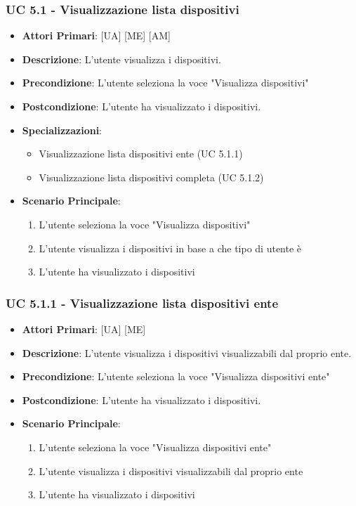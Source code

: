 			\subsubsection{UC 5.1 - Visualizzazione lista dispositivi}
			\begin{itemize}
				\item \textbf{Attori Primari}: [UA] [ME] [AM]
				\item \textbf{Descrizione}: L'utente visualizza i dispositivi.
				\item \textbf{Precondizione}: L'utente seleziona la voce "Visualizza dispositivi"
				\item \textbf{Postcondizione}: L'utente ha visualizzato i dispositivi.
				\item \textbf{Specializzazioni}:
				\begin{itemize}
					\item Visualizzazione lista dispositivi ente (UC 5.1.1)
					\item Visualizzazione lista dispositivi completa (UC 5.1.2)
				\end{itemize}
				\item \textbf{Scenario Principale}:
				\begin{enumerate}
					\item{L'utente seleziona la voce "Visualizza dispositivi"}
					\item{L'utente visualizza i dispositivi in base a che tipo di utente è}
					\item{L'utente ha visualizzato i dispositivi}
				\end{enumerate}
			\end{itemize}
			
			\subsubsection{UC 5.1.1 - Visualizzazione lista dispositivi ente}
			\begin{itemize}
				\item \textbf{Attori Primari}: [UA] [ME]
				\item \textbf{Descrizione}: L'utente visualizza i dispositivi visualizzabili dal proprio ente.
				\item \textbf{Precondizione}: L'utente seleziona la voce "Visualizza dispositivi ente"
				\item \textbf{Postcondizione}: L'utente ha visualizzato i dispositivi.
				\item \textbf{Scenario Principale}:
				\begin{enumerate}
					\item{L'utente seleziona la voce "Visualizza dispositivi ente"}
					\item{L'utente visualizza i dispositivi visualizzabili dal proprio ente}
					\item{L'utente ha visualizzato i dispositivi}
				\end{enumerate}
			\end{itemize}
			

